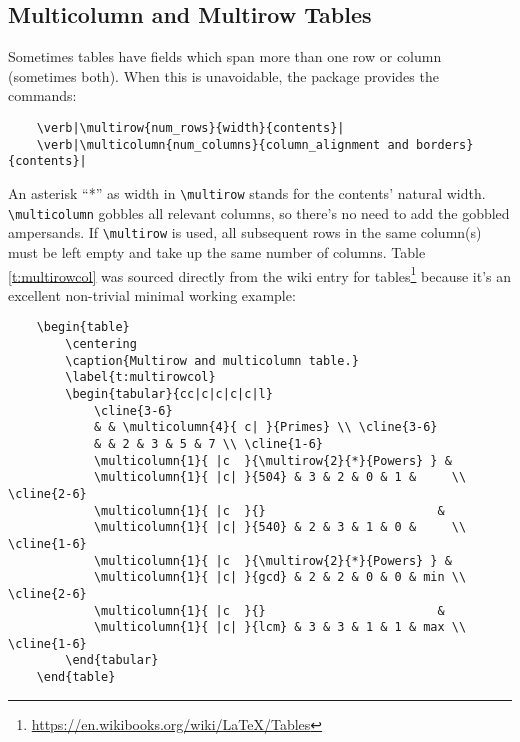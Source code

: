 \subsection{Multicolumn and Multirow Tables}
%
Sometimes tables have fields which span more than one row or column
(sometimes both).  When this is unavoidable, the 
package provides the commands:
\begin{verbatim}
	\verb|\multirow{num_rows}{width}{contents}|
	\verb|\multicolumn{num_columns}{column_alignment and borders}{contents}|
\end{verbatim}
An asterisk ``*'' as width in \verb|\multirow| stands for the
contents' natural width.  \verb|\multicolumn| gobbles all relevant
columns, so there's no need to add the gobbled ampersands.  If
\verb|\multirow| is used, all subsequent rows in the same column(s)
must be left empty and take up the same number of columns.  Table
\ref{t:multirowcol} was sourced directly from the wiki entry for
tables\footnote{\url{https://en.wikibooks.org/wiki/LaTeX/Tables}}
because it's an excellent non-trivial minimal working example:
\begin{verbatim}
	\begin{table}
	    \centering
	    \caption{Multirow and multicolumn table.}
	    \label{t:multirowcol}
	    \begin{tabular}{cc|c|c|c|c|l}
	        \cline{3-6}
	        & & \multicolumn{4}{ c| }{Primes} \\ \cline{3-6}
	        & & 2 & 3 & 5 & 7 \\ \cline{1-6}
	        \multicolumn{1}{ |c  }{\multirow{2}{*}{Powers} } &
	        \multicolumn{1}{ |c| }{504} & 3 & 2 & 0 & 1 &     \\ \cline{2-6}
	        \multicolumn{1}{ |c  }{}                        &
	        \multicolumn{1}{ |c| }{540} & 2 & 3 & 1 & 0 &     \\ \cline{1-6}
	        \multicolumn{1}{ |c  }{\multirow{2}{*}{Powers} } &
	        \multicolumn{1}{ |c| }{gcd} & 2 & 2 & 0 & 0 & min \\ \cline{2-6}
	        \multicolumn{1}{ |c  }{}                        &
	        \multicolumn{1}{ |c| }{lcm} & 3 & 3 & 1 & 1 & max \\ \cline{1-6}
	    \end{tabular}
	\end{table}
\end{verbatim}
